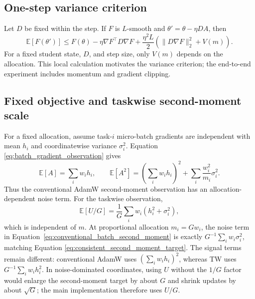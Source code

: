 \subsection{One-step variance criterion}
\label{app:descent}

Let $D$ be fixed within the step. If $F$ is $L$-smooth and
$\theta'=\theta-\eta DA$, then
\begin{equation}
    \mathbb E[F(\theta')]
    \leq F(\theta)-\eta\nabla F^\top D\nabla F
    +\frac{\eta^2L}{2}
      \left(\|D\nabla F\|_2^2+V(m)\right).
    \label{eq:one_step_descent}
\end{equation}
For a fixed student state, $D$, and step size, only $V(m)$ depends on the
allocation. This local calculation motivates the variance criterion; the
end-to-end experiment includes momentum and gradient clipping.

\subsection{Fixed objective and taskwise second-moment scale}
\label{app:moment_target_proof}

For a fixed allocation, assume task-$i$ micro-batch gradients are independent
with mean $h_i$ and coordinatewise variance $\sigma_i^2$. Equation
\ref{eq:batch_gradient_observation} gives
\begin{equation}
    \mathbb E[A]=\sum_iw_i h_i,
    \qquad
    \mathbb E[A^2]=\left(\sum_iw_i h_i\right)^2
    +\sum_i\frac{w_i^2}{m_i}\sigma_i^2.
    \label{eq:conventional_batch_second_moment}
\end{equation}
Thus the conventional AdamW second-moment observation has an
allocation-dependent noise term. For the taskwise observation,
\begin{equation}
    \mathbb E[U/G]
    =\frac{1}{G}\sum_iw_i\left(h_i^2+\sigma_i^2\right),
    \label{eq:consistent_second_moment_target}
\end{equation}
which is independent of $m$. At proportional allocation $m_i=Gw_i$, the noise
term in Equation~\ref{eq:conventional_batch_second_moment} is exactly
$G^{-1}\sum_iw_i\sigma_i^2$, matching Equation
\ref{eq:consistent_second_moment_target}. The signal terms remain different:
conventional AdamW uses $(\sum_iw_i h_i)^2$, whereas TW uses
$G^{-1}\sum_iw_i h_i^2$. In noise-dominated coordinates, using $U$ without the
$1/G$ factor would enlarge the second-moment target by about $G$ and shrink
updates by about $\sqrt G$; the main implementation therefore uses $U/G$.

